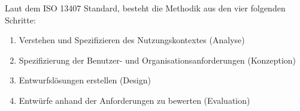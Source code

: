 Laut dem ISO 13407 Standard, besteht die Methodik aus den vier folgenden Schritte:

\begin{enumerate}
	\item Verstehen und Spezifizieren des Nutzungskontextes (Analyse)
	\item Spezifizierung der Benutzer- und Organisationsanforderungen (Konzeption)
	\item Entwurfslösungen erstellen (Design)
	\item Entwürfe anhand der Anforderungen zu bewerten (Evaluation)
\end{enumerate}



